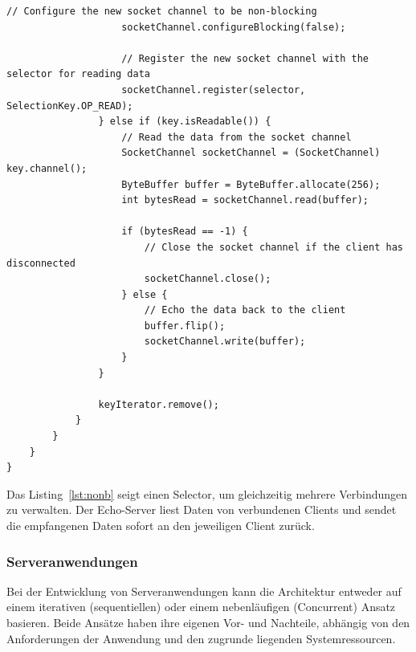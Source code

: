 \documentclass[../vs-script-first-v01.tex]{subfiles}
\begin{document}
\begin{lstlisting}[caption={Non-Blocking},captionpos=b,label={lst:nonb}]
                    // Configure the new socket channel to be non-blocking
                    socketChannel.configureBlocking(false);

                    // Register the new socket channel with the selector for reading data
                    socketChannel.register(selector, SelectionKey.OP_READ);
                } else if (key.isReadable()) {
                    // Read the data from the socket channel
                    SocketChannel socketChannel = (SocketChannel) key.channel();
                    ByteBuffer buffer = ByteBuffer.allocate(256);
                    int bytesRead = socketChannel.read(buffer);

                    if (bytesRead == -1) {
                        // Close the socket channel if the client has disconnected
                        socketChannel.close();
                    } else {
                        // Echo the data back to the client
                        buffer.flip();
                        socketChannel.write(buffer);
                    }
                }

                keyIterator.remove();
            }
        }
    }
}
\end{lstlisting}
Das Listing~\ref{lst:nonb} seigt einen Selector, um gleichzeitig mehrere Verbindungen zu verwalten. Der Echo-Server liest Daten von verbundenen Clients und sendet die empfangenen Daten sofort an den jeweiligen Client zurück.

\subsubsection{Serveranwendungen}
Bei der Entwicklung von Serveranwendungen kann die Architektur entweder auf einem iterativen (sequentiellen) oder einem nebenläufigen (Concurrent) Ansatz basieren. Beide Ansätze haben ihre eigenen Vor- und Nachteile, abhängig von den Anforderungen der Anwendung und den zugrunde liegenden Systemressourcen. 
\end{document}
